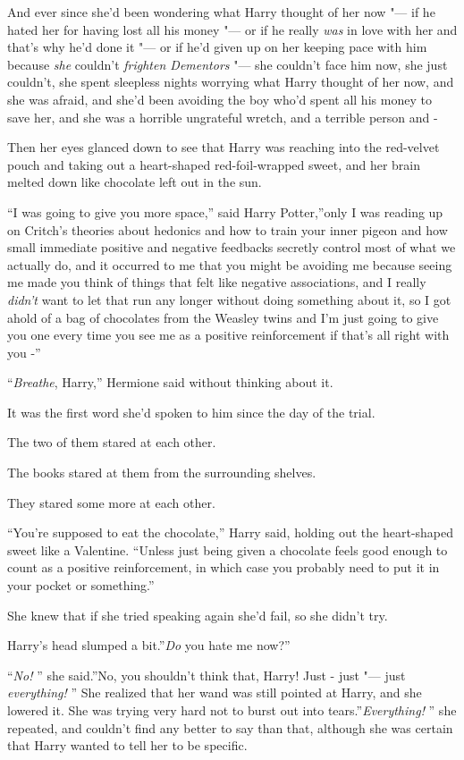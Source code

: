 And ever since she'd been wondering what Harry thought of her now "--- if
he hated her for having lost all his money "--- or if he really \emph{was}
in love with her and that's why he'd done it "--- or if he'd given up on
her keeping pace with him because \emph{she} couldn't \emph{frighten
Dementors} "--- she couldn't face him now, she just couldn't, she spent
sleepless nights worrying what Harry thought of her now, and she was
afraid, and she'd been avoiding the boy who'd spent all his money to
save her, and she was a horrible ungrateful wretch, and a terrible
person and -

Then her eyes glanced down to see that Harry was reaching into the
red-velvet pouch and taking out a heart-shaped red-foil-wrapped sweet,
and her brain melted down like chocolate left out in the sun.

``I was going to give you more space,'' said Harry Potter,''only I was
reading up on Critch's theories about hedonics and how to train your
inner pigeon and how small immediate positive and negative feedbacks
secretly control most of what we actually do, and it occurred to me that
you might be avoiding me because seeing me made you think of things that
felt like negative associations, and I really \emph{didn't} want to let
that run any longer without doing something about it, so I got ahold of
a bag of chocolates from the Weasley twins and I'm just going to give
you one every time you see me as a positive reinforcement if that's all
right with you -''

``\emph{Breathe}, Harry,'' Hermione said without thinking about it.

It was the first word she'd spoken to him since the day of the trial.

The two of them stared at each other.

The books stared at them from the surrounding shelves.

They stared some more at each other.

``You're supposed to eat the chocolate,'' Harry said, holding out the
heart-shaped sweet like a Valentine. ``Unless just being given a
chocolate feels good enough to count as a positive reinforcement, in
which case you probably need to put it in your pocket or something.''

She knew that if she tried speaking again she'd fail, so she didn't try.

Harry's head slumped a bit.''\emph{Do} you hate me now?''

``\emph{No!} '' she said.''No, you shouldn't think that, Harry! Just -
just "--- just \emph{everything!} '' She realized that her wand was still
pointed at Harry, and she lowered it. She was trying very hard not to
burst out into tears.''\emph{Everything!} '' she repeated, and couldn't
find any better to say than that, although she was certain that Harry
wanted to tell her to be specific.

